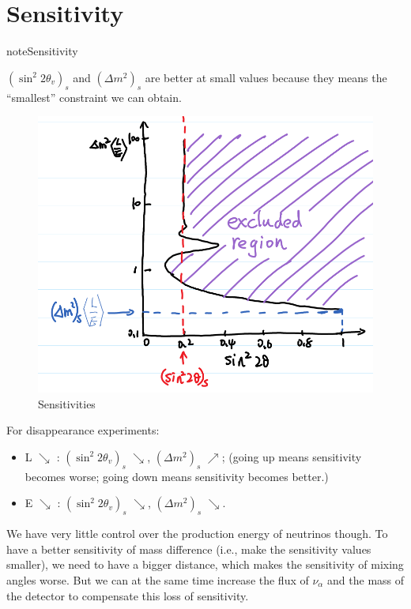 \documentclass[letterpaper,12pt,english]{sphinxmanual}
\begin{document}
\section{Sensitivity}
\label{experiments:sensitivity}
\begin{notice}{note}{Sensitivity}

\((\sin^2 2\theta_v)_s\) and \((\Delta m^2)_s\) are better at small values because they means the ``smallest'' constraint we can obtain.
\begin{figure}[htbp]
\centering
\capstart

\includegraphics{exclusionCurveSensitivity.png}
\caption{Sensitivities}\end{figure}
\end{notice}

For disappearance experiments:
\begin{itemize}
\item {} 
L \(\searrow\) : \((\sin^2 2\theta_v)_s\) \(\searrow\), \((\Delta m^2)_s\) \(\nearrow\); (going up means sensitivity becomes worse; going down means sensitivity becomes better.)

\item {} 
E \(\searrow\) : \((\sin^2 2\theta_v)_s\) \(\searrow\), \((\Delta m^2)_s\) \(\searrow\).

\end{itemize}

We have very little control over the production energy of neutrinos though. To have a better sensitivity of mass difference (i.e., make the sensitivity values smaller), we need to have a bigger distance, which makes the sensitivity of mixing angles worse. But we can at the same time increase the flux of \(\nu_\alpha\) and the mass of the detector to compensate this loss of sensitivity.
\end{document}

